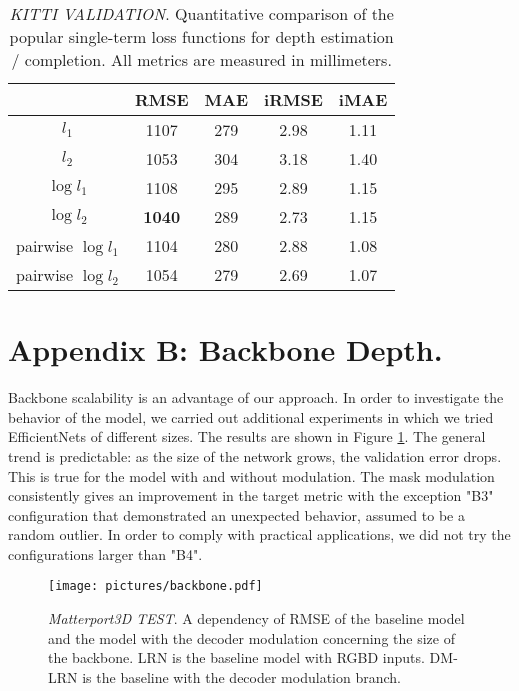 \documentclass[final]{cvpr}
\begin{document}
    
    \begin{table}[ht]
    \setlength{\tabcolsep}{7pt}
    \renewcommand{\arraystretch}{1.1}
    \centering
    	\begin{tabular}{ c|c|c|c|c}    
& RMSE & MAE & iRMSE & iMAE \\
    		\hline
    		\hline
    		$l_1$ & 1107 & 279 & 2.98 & 1.11  \\
    		$l_2$ & 1053 & 304 & 3.18 & 1.40 \\
    		$\log l_1$ & 1108 & 295 & 2.89 & 1.15 \\
    		$\log l_2$ & \textbf{1040} & 289 & 2.73 & 1.15 \\
    		pairwise $\log l_1$& 1104 & 280 & 2.88 & 1.08 \\
    		pairwise $\log l_2$& 1054 & 279 & 2.69 & 1.07 \\
    		\hline
    
    	\end{tabular}
    	\vspace{0.1cm}
    	\caption{\emph{KITTI VALIDATION}. Quantitative comparison of the popular single-term loss functions for depth estimation / completion. All metrics are measured in millimeters.}
    	\label{tab:kitti_loss_study}
    \end{table}

\section*{Appendix B: Backbone Depth.}
    
    Backbone scalability is an advantage of our approach. In order to investigate the behavior of the model, we carried out additional experiments in which we tried EfficientNets of different sizes. The results are shown in Figure \ref{fig:backbone_study}. The general trend is predictable: as the size of the network grows, the validation error drops. This is true for the model with and without modulation. The mask modulation consistently gives an improvement in the target metric with the exception "B3" configuration that demonstrated an unexpected behavior, assumed to be a random outlier. In order to comply with practical applications, we did not try the configurations larger than "B4".
    
    \begin{figure}[!h]
        \centering
        \texttt{[image: pictures/backbone.pdf]}
        \caption{\emph{Matterport3D TEST}. A dependency of RMSE of the baseline model and the model with the decoder modulation concerning the size of the backbone. LRN is the baseline model with RGBD inputs. DM-LRN is the baseline with the decoder modulation branch.}
        \label{fig:backbone_study}
    \end{figure}
\end{document}
